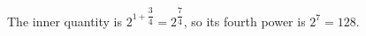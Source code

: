 The inner quantity is $ 2^{1+\dfrac{3}{4}}=2^{\dfrac{7}{4}}$, so its fourth power is $ 2^7=\boxed{128}$.

